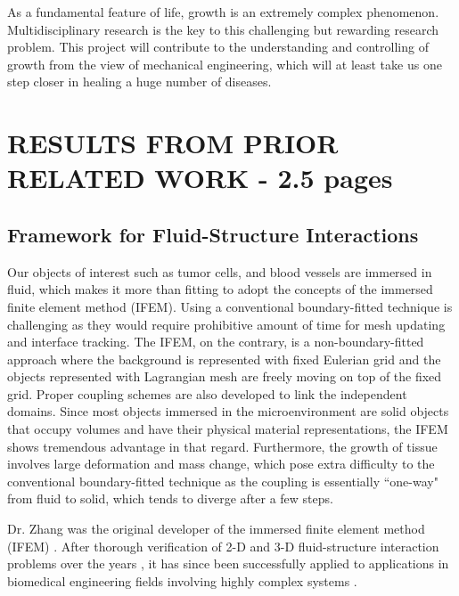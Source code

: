 \documentclass[12pt]{article}
\begin{document}
As a fundamental feature of life, growth is an extremely complex phenomenon. Multidisciplinary research is the key to this challenging but rewarding research problem. This project will contribute to the understanding and controlling of growth from the view of mechanical engineering, which will at least take us one step closer in healing a huge number of diseases.

\section{RESULTS FROM PRIOR RELATED WORK - 2.5 pages}

\subsection{Framework for Fluid-Structure Interactions}
Our objects of interest such as tumor cells, and blood vessels are immersed in fluid, which makes it more than fitting to adopt the concepts of the immersed finite element method (IFEM). Using a conventional boundary-fitted technique is challenging as they would require prohibitive amount of time for mesh updating and interface tracking. The IFEM, on the contrary, is a non-boundary-fitted approach where the background is represented with fixed Eulerian grid and the objects represented with Lagrangian mesh are freely moving on top of the fixed grid. Proper coupling schemes are also developed to link the independent domains. Since most objects immersed in the microenvironment are solid objects that occupy volumes and have their physical material representations, the IFEM shows tremendous advantage in that regard. Furthermore, the growth of tissue involves large deformation and mass change, which pose extra difficulty to the conventional boundary-fitted technique as the coupling is essentially ``one-way"  from fluid to solid, which tends to diverge after a few steps.

Dr. Zhang was the original developer of the immersed finite element method (IFEM) \cite{Zhang}. After thorough verification of 2-D and 3-D fluid-structure interaction problems over the years \cite{Zhang,Zhang2,Zhang3,Zhang4,Zhang5,Zhang6,Zhang7,Zhang8} , it has since been successfully applied to applications in biomedical engineering fields involving highly complex systems \cite{Zhang9,Zhang10,Zhang11,Zhang12,Zhang13,Zhang14,Zhang15,Zhang18}.
\end{document}
